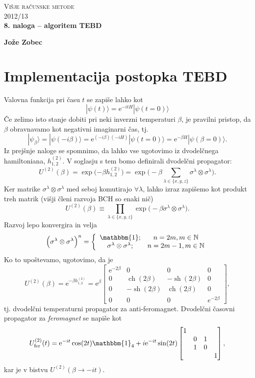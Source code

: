 \documentclass[12pt, a4 paper]{article}
\newcommand{\e}{
	\ensuremath{\mathrm{e}}
}
\newcommand{\ch}{
	\operatorname{ch}
}
\newcommand{\sh}{
	\operatorname{sh}
}
\begin{document}
\begin{center}
\textsc{Vi\v sje ra\v cunske metode}\\
\textsc{2012/13}\\[0.5cm]
\textbf{8. naloga -- algoritem TEBD}
\end{center}
\begin{flushright}
\textbf{Jo\v ze Zobec}
\end{flushright}

\section{Implementacija postopka TEBD}

Valovna funkcija pri \v casu $t$ se zapi\v se lahko kot
\[
	|\psi(t)\rangle = \e^{-itH} |\psi(t = 0)\rangle
\]
\v Ce zelimo isto stanje dobiti pri neki inverzni temperaturi $\beta$, je pravilni pristop, da $\beta$ obravnavamo
kot negativni imaginarni \v cas, tj.
\[
	|\psi_{\beta}\rangle = |\psi(-i\beta)\rangle = \e^{(-i\beta)(-i H)}|\psi(t = 0)\rangle = \e^{-\beta H}
		|\psi(\beta=0)\rangle.
\]
Iz prej\v snje naloge se spomnimo, da lahko vse ugotovimo iz dvodel\v cnega hamiltoniana, $h^{(2)}_{1,2}$. V soglasju s tem
bomo definirali dvodel\v cni propagator:
\[
	U^{(2)}(\beta) = \exp\Big({-\beta h^{(2)}_{1,2}}\Big) = \exp\bigg(-\beta\sum_{\lambda \in \{x,y,z\}}\sigma^\lambda
		\otimes \sigma^\lambda\bigg).
\]
Ker matrike $\sigma^\lambda \otimes \sigma^\lambda$ med seboj komutirajo $\forall \lambda$, lahko izraz zapi\v semo kot
produkt treh matrik (vi\v sji \v cleni razvoja BCH so enaki ni\v c)
\begin{equation}
	U^{(2)}(\beta) \equiv \prod_{\lambda \in \{x,y,z\}} \exp\big(-\beta \sigma^\lambda \otimes \sigma^\lambda\big).
\end{equation}
Razvoj lepo konvergira in velja
\[
	\Big(\sigma^\lambda \otimes \sigma^\lambda\Big)^n = \left\{
		\begin{array}{cc}
			\mathbbm{1}; & n = 2m, m \in \mathbb{N} \\
			\sigma^\lambda \otimes \sigma^\lambda; & n = 2m - 1, m \in \mathbb{N}
		\end{array}
	\right.
\]
Ko to upo\v stevamo, ugotovimo, da je
\[
	U^{(2)}(\beta) = \e^{-\beta h^{(2)}_{1,2}} = \e^{\beta}\begin{bmatrix}
		\e^{-2\beta} & 0 & 0 & 0\\
		0 & \ch(2\beta) & -\sh(2\beta) & 0 \\
		0 & -\sh(2\beta) & \ch(2\beta) & 0 \\
		0 & 0 & 0 & e^{-2\beta}
	\end{bmatrix},
\]
tj. dvodel\v cni temperaturni propagator za anti-feromagnet. Dvodel\v cni \v casovni propagator za \emph{feromagnet} se
napi\v se kot
\[
	U^{(2)}_\text{fer}(t) = \e^{-it}\cos(2t)\mathbbm{1}_4 + i\e^{-it}\sin(2t) \begin{bmatrix}
		1 &  &  &  \\
		 & 0 & 1 &  \\
		 & 1 & 0 &  \\
		 &  &  & 1 \end{bmatrix},
\]
kar je v bistvu $U^{(2)}(\beta \to -it)$.
\end{document}
